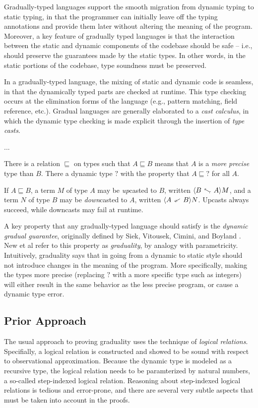 \documentclass[acmsmall,screen]{acmart}
\newcommand{\dyn}{?}
\newcommand{\ltdyn}{\sqsubseteq}
\newcommand{\uarrowl}{\mathrel{\rotatebox[origin=c]{-30}{$\leftarrowtail$}}}
\newcommand{\darrowl}{\mathrel{\rotatebox[origin=c]{30}{$\twoheadleftarrow$}}}
\newcommand{\up}[2]{\langle{#2}\uarrowl{#1}\rangle}
\newcommand{\dn}[2]{\langle{#1}\darrowl{#2}\rangle}
\begin{document}
  Gradually-typed languages support the smooth migration from dynamic typing
  to static typing, in that the programmer can initially leave off the
  typing annotations and provide them later without altering the meaning of the
  program. Moreover, a key feature of gradually typed languages is that the interaction
  between the static and dynamic components of the codebase should be safe -- i.e., should
  preserve the guarantees made by the static types.
  In other words, in the static portions of the codebase, type soundness must be preserved.


  In a gradually-typed language, the mixing of static and dynamic code is seamless, in that
  the dynamically typed parts are checked at runtime. This type checking occurs at the elimination
  forms of the language (e.g., pattern matching, field reference, etc.).
  Gradual languages are generally elaborated to a \emph{cast calculus}, in which the dynamic
  type checking is made explicit through the insertion of \emph{type casts}.

  ...

  There is a relation $\ltdyn$ on types such that $A \ltdyn B$ means that $A$ is a \emph{more
  precise} type than $B$.
  There a dynamic type $\dyn$ with the property that $A \ltdyn \dyn$ for all $A$.

  If $A \ltdyn B$, a term $M$ of type $A$ may be \emph{up}casted to $B$, written $\up A B M$,
  and a term $N$ of type $B$ may be \emph{down}casted to $A$, written $\dn A B N$.
  Upcasts always succeed, while downcasts may fail at runtime.

  A key property that any gradually-typed language should satisfy is the \emph{dynamic gradual guarantee},
  originally defined by Siek, Vitousek, Cimini, and Boyland \cite{TODO}.
  New et al refer to this property as \emph{graduality}, by analogy with parametricity.
  Intuitively, graduality says that in going from a dynamic to static style
  should not introduce changes in the meaning of the program.
  More specifically, making the types more precise (replacing $\dyn$ with a more specific type
  such as integers) will either result in the same behavior as the less precise program,
  or cause a dynamic type error.

  
  
  \subsection{Prior Approach}
  The usual approach to proving graduality uses the technique of \emph{logical relations}.
  Specifially, a logical relation is constructed and showed to be sound with respect to
  observational approximation. Because the dynamic type is modeled as a recursive type,
  the logical relation needs to be paramterized by natural numbers, a so-called
  step-indexed logical relation. Reasoning about step-indexed logical relations
  is tedious and error-prone, and there are several very subtle aspects that must
  be taken into account in the proofs.
\end{document}
